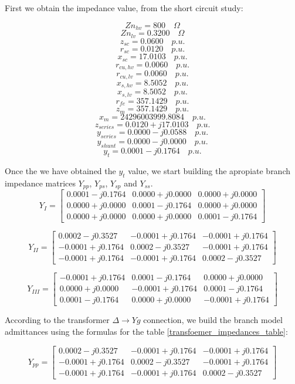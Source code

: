 \documentclass{tufte-book}
\begin{document}
First we obtain the impedance value, from the short circuit study:
\begin{multicols}{2}
$$Zn_{hv} =  800 \quad \Omega$$
$$Zn_{lv} =  0.3200 \quad \Omega$$
$$z_{sc} =  0.0600 \quad p.u.$$
$$r_{sc} =  0.0120 \quad p.u.$$
$$x_{sc} =  17.0103 \quad p.u.$$
$$r_{cu,hv} =  0.0060 \quad p.u.$$
$$r_{cu,lv} =  0.0060 \quad p.u.$$
$$x_{s,hv} =  8.5052 \quad p.u.$$
$$x_{s,lv} =  8.5052 \quad p.u.$$
$$r_{fe} =  357.1429 \quad p.u.$$
$$z_m =  357.1429 \quad p.u.$$
$$x_m =  24296003999.8084 \quad p.u.$$
$$z_{series} =  0.0120 + j17.0103 \quad p.u.$$
$$y_{series} =  0.0000 - j0.0588 \quad p.u.$$
$$y_{shunt} =  0.0000 - j0.0000 \quad p.u.$$
$$y_t =  0.0001 - j0.1764 \quad p.u.$$
\end{multicols}

Once the we have obtained the $y_t$ value, we start building the apropiate branch impedance matrices $Y_{pp}$, $Y_{ps}$, $Y_{sp}$ and $Y_{ss}$.
$$
Y_{I} = \left[\begin{array}{ccc}
0.0001 - j0.1764 & 0.0000 + j0.0000 & 0.0000 + j0.0000 \\
0.0000 + j0.0000 & 0.0001 - j0.1764 & 0.0000 + j0.0000 \\
0.0000 + j0.0000 & 0.0000 + j0.0000 & 0.0001 - j0.1764
\end{array} \right]
$$


$$
Y_{II} = \left[ \begin{array}{ccc}
0.0002 - j0.3527 & -0.0001 + j0.1764 & -0.0001 + j0.1764\\
-0.0001 + j0.1764 & 0.0002 - j0.3527 & -0.0001 + j0.1764\\
-0.0001 + j0.1764 & -0.0001 + j0.1764 & 0.0002 - j0.3527
\end{array} \right]
$$

$$
Y_{III} = \left[ \begin{array}{ccc}
-0.0001 + j0.1764 & 0.0001 - j0.1764 & 0.0000 + j0.0000\\
0.0000 + j0.0000 & -0.0001 + j0.1764 & 0.0001 - j0.1764\\
0.0001 - j0.1764 & 0.0000 + j0.0000 & -0.0001 + j0.1764
\end{array} \right]
$$


According to the transformer $\Delta \rightarrow Yg$ connection, we build the branch model admittances using the formulas for the table \ref{transfoemer_impedances_table}:

$$
Y_{pp} =\left[ \begin{array}{ccc}
0.0002 - j0.3527 & -0.0001 + j0.1764 & -0.0001 + j0.1764\\
-0.0001 + j0.1764 & 0.0002 - j0.3527 & -0.0001 + j0.1764\\
-0.0001 + j0.1764 & -0.0001 + j0.1764 & 0.0002 - j0.3527
\end{array} \right]
$$
\end{document}
